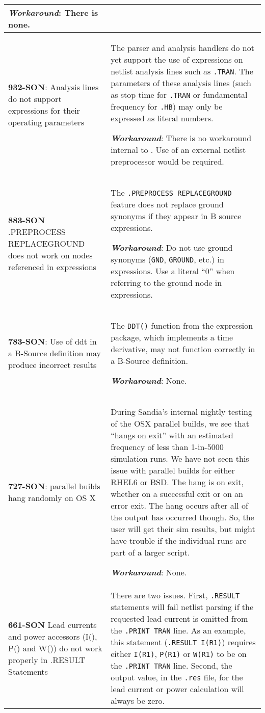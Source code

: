 {\begin{longtable}[h] {>{\raggedright\small}m{2in}|>{\raggedright\let\\\tabularnewline\small}m{3.5in}}
\textbf{\textit{Workaround}}: There is none.
\\ \hline

\textbf{932-SON}: Analysis lines do not support expressions for their
operating parameters & The \Xyce{} parser and analysis handlers do not
yet support the use of expressions on netlist analysis lines such
as \texttt{.TRAN}.  The parameters of these analysis lines (such as
stop time for \texttt{.TRAN} or fundamental frequency
for \texttt{.HB}) may only be expressed as literal numbers.

\textbf{\textit{Workaround}}: There is no workaround internal to \Xyce{}.
Use of an external netlist preprocessor would be required. \\ \hline

\textbf{883-SON} .PREPROCESS REPLACEGROUND does not work on nodes referenced
in expressions & The \texttt{.PREPROCESS REPLACEGROUND} feature does
not replace ground synonyms if they appear in B source expressions.

\textbf{\textit{Workaround}}: Do not use ground synonyms (\texttt{GND},
\texttt{GROUND}, etc.) in expressions.  Use a literal ``0'' when
referring to the ground node in expressions.\\ \hline

\textbf{783-SON}: Use of ddt in a B-Source definition may produce incorrect
results & The \texttt{DDT()} function from the \Xyce{} expression
package, which implements a time derivative, may not function
correctly in a B-Source definition.

\textbf{\textit{Workaround}}: None. \\ \hline

\textbf{727-SON}: \Xyce{} parallel builds hang randomly on OS X & During
Sandia's internal nightly testing of the OSX parallel builds, we see
that \Xyce{} ``hangs on exit'' with an estimated frequency of less
than 1-in-5000 simulation runs.  We have not seen this issue with
parallel builds for either RHEL6 or BSD.  The hang is on exit, whether
on a successful exit or on an error exit.  The hang occurs after all
of the \Xyce{} output has occurred though.  So, the user will get
their sim results, but might have trouble if the individual \Xyce{}
runs are part of a larger script.

\textbf{\textit{Workaround}}: None. \\ \hline

\textbf{661-SON} Lead currents and power accessors (I(), P() and W()) do
not work properly in .RESULT Statements & There are two issues.
First, \texttt{.RESULT} statements will fail netlist parsing if the
requested lead current is omitted from the \texttt{.PRINT TRAN}
line.  As an example, this statement (\texttt{.RESULT I(R1)}) requires
either \texttt{I(R1)},
\texttt{P(R1)} or \texttt{W(R1)} to be on the \texttt{.PRINT TRAN} line.
Second, the output value, in the \texttt{.res} file, for the lead
current or power calculation will always be zero.
\\ \hline


\end{longtable}}
